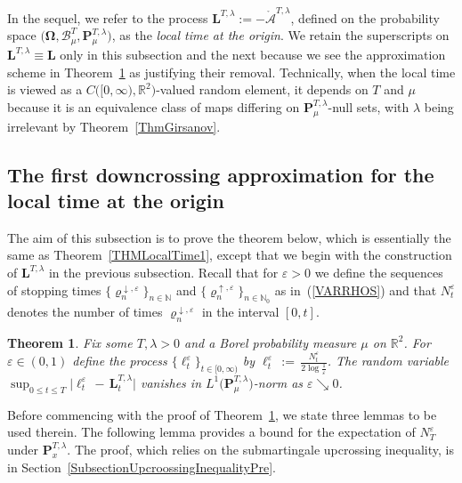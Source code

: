 \documentclass[10pt]{article}
\numberwithin{equation}{section}
\newtheorem{theorem}{Theorem}[section]
\theoremstyle{definition}
\newcommand{\R}{{\mathbb R}}
\begin{document}
In the sequel, we refer to the process  $\mathbf{L}^{T,\lambda} :=-\mathring{\mathcal{A}}^{T,\lambda}$,  defined on the probability space $\big(\boldsymbol{\Omega}, \mathscr{B}_{\mu}^T , \mathbf{P}_{\mu}^{T,\lambda} \big)$, as the \textit{local time at the origin}.  We retain the superscripts on $\mathbf{L}^{T,\lambda}\equiv \mathbf{L}$ only in this subsection and the next because we see the approximation scheme in Theorem~\ref{ThmLocalTime1} as justifying their removal. Technically, when the local time is viewed as a $C\big([0,\infty),\R^2  \big)$-valued random element, it depends on $T$ and $\mu$ because it is an equivalence class of maps differing on $ \mathbf{P}_{\mu}^{T,\lambda}$-null sets, with $\lambda$ being irrelevant by Theorem~\ref{ThmGirsanov}. 




\subsection{The first downcrossing approximation for the  local time at the origin}\label{SectionLocalTimeDowncrossing}
The aim of this subsection is to prove  the theorem below, which is essentially the same as Theorem~\ref{THMLocalTime1}, except that we begin with the   construction of $\mathbf{L}^{T,\lambda}$ in the previous subsection. Recall that for $\varepsilon >0$ we define the sequences of stopping times $\{\varrho_{n}^{\downarrow,\varepsilon}\}_{n\in \mathbb{N}}$ and $\{\varrho_{n}^{\uparrow,\varepsilon}\}_{n\in \mathbb{N}_0}$ as in~(\ref{VARRHOS}) and that $N_{t}^{\varepsilon}$  denotes the   number of times $\varrho_{n}^{\downarrow,\varepsilon}$  in the interval $[0,t]$.
\begin{theorem}\label{ThmLocalTime1} Fix some $T,\lambda >0$ and  a Borel probability measure $\mu$  on $\R^2$. For $\varepsilon\in (0,1)$ 
define the process $\{\ell_{t}^{\varepsilon}\}_{t\in [0,\infty)}$ by $ \ell_{t}^{\varepsilon}\,:=\,\frac{N_{t}^{\varepsilon} }{  2\log \frac{1}{\varepsilon} }$.  The random variable 
$\sup_{0\leq t\leq T}\big| \ell_{t}^{\varepsilon}\,-\,\mathbf{L}_{t}^{T,\lambda}\big|$ vanishes in $L^1\big(\mathbf{P}_{\mu}^{T,\lambda}\big)$-norm as $\varepsilon \searrow 0$.  
\end{theorem}
 Before commencing with the proof of Theorem~\ref{ThmLocalTime1}, we  state three lemmas to be used therein.   The following lemma provides a bound for the expectation of $N_{T}^{\varepsilon}$ under $\mathbf{P}^{T,\lambda}_{x}$. The proof, which relies on the submartingale upcrossing inequality, is in Section~\ref{SubsectionUpcroossingInequalityPre}.
\end{document}
